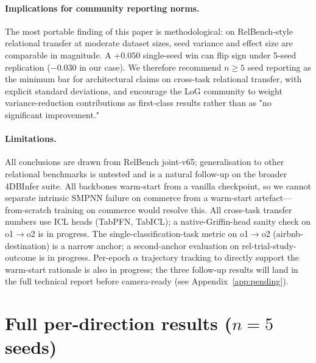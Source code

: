 \documentclass{article}
\begin{document}
\paragraph{Implications for community reporting norms.}
The most portable finding of this paper is methodological: on RelBench-style relational transfer at moderate dataset sizes, seed variance and effect size are comparable in magnitude. A $+0.050$ single-seed win can flip sign under 5-seed replication ($-0.030$ in our case). We therefore recommend $n\!\ge\!5$ seed reporting as the minimum bar for architectural claims on cross-task relational transfer, with explicit standard deviations, and encourage the LoG community to weight variance-reduction contributions as first-class results rather than as "no significant improvement."

\paragraph{Limitations.}
All conclusions are drawn from RelBench joint-v65; generalisation to other relational benchmarks is untested and is a natural follow-up on the broader 4DBInfer suite. All backbones warm-start from a vanilla checkpoint, so we cannot separate intrinsic SMPNN failure on commerce from a warm-start artefact---from-scratch training on commerce would resolve this. All cross-task transfer numbers use ICL heads (TabPFN, TabICL); a native-Griffin-head sanity check on o1$\to$o2 is in progress. The single-classification-task metric on o1$\to$o2 (airbnb-destination) is a narrow anchor; a second-anchor evaluation on rel-trial-study-outcome is in progress. Per-epoch $\alpha$ trajectory tracking to directly support the warm-start rationale is also in progress; the three follow-up results will land in the full technical report before camera-ready (see Appendix~\ref{app:pending}).




\appendix

\section{Full per-direction results ($n{=}5$ seeds)}
\label{app:detail}
\end{document}

